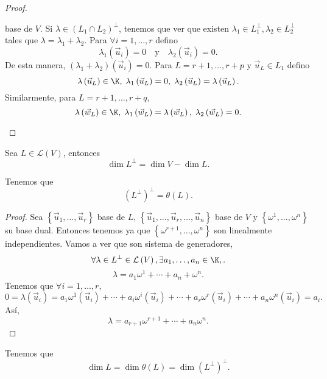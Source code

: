 \begin{proof}
\begin{description}
	base de $\displaystyle V $. Si $\displaystyle \lambda \in \left(L_{1}\cap L_{2}\right)^{\perp}$, tenemos que ver que existen $\displaystyle \lambda_{1} \in L_{1}^{\perp}, \lambda_{2}\in L_{2}^{\perp} $ tales que $\displaystyle \lambda = \lambda_{1} + \lambda_{2} $. Para $\displaystyle \forall i = 1, \ldots, r $ defino 
	\[\lambda_{1}\left(\vec{u}_{i}\right) = 0 \quad \text{y} \quad \lambda_{2}\left(\vec{u}_{i}\right) = 0 .\]
De esta manera, $\displaystyle \left(\lambda_{1}+\lambda_{2}\right)\left(\vec{u}_{i}\right) = 0 $. Para $\displaystyle L = r+1, \ldots, r+p $ y $\displaystyle \vec{u}_{L} \in L_{1} $ defino
\[\lambda\left(\vec{u}_{L}\right) \in \K, \;  \lambda_{1}\left(\vec{u}_{L}\right) = 0, \; \lambda_{2}\left(\vec{u}_{L}\right) = \lambda\left(\vec{u}_{L}\right) .\]
Similarmente, para $\displaystyle L = r+1, \ldots, r+q $, 
\[\lambda\left(\vec{w}_{L}\right) \in \K, \; \lambda_{1}\left(\vec{w}_{L}\right) = \lambda\left(\vec{w}_{L}\right), \; \lambda_{2}\left(\vec{w}_{L}\right) = 0 .\]

\end{description}
\end{proof}

\begin{ftheorem}[]
\normalfont Sea $\displaystyle L \in \mathcal{L}\left(V\right) $, entonces 
\[\dim L^{\perp} = \dim V - \dim L .\]
\end{ftheorem}

\begin{observation}
\normalfont Tenemos que 
\[\left(L^{\perp}\right)^{\perp} = \theta\left(L\right) .\]
\end{observation}

\begin{proof}
	Sea $\displaystyle \left\{\vec{u}_{1}, \ldots, \vec{u}_{r} \right\}  $ base de $\displaystyle L $, $\displaystyle \left\{ \vec{u}_{1}, \ldots, \vec{u}_{r}, \ldots, \vec{u}_{n}\right\}  $ base de $\displaystyle V $ y $\displaystyle \left\{ \omega^{1}, \ldots, \omega^{n}\right\}  $ su base dual. Entonces tenemos ya que $\displaystyle \left\{ \omega^{r+1}, \ldots, \omega^{n}\right\}  $ son linealmente independientes. Vamos a ver que son sistema de generadores, 
	\[\forall \lambda \in L^{\perp} \in \mathcal{L}\left(V\right), \exists a_{1}, \ldots, a_{n} \in \K, .\]
	\[\lambda = a_{1}\omega^{1} + \cdots + a_{n}+\omega^{n} .\]
Tenemos que $\displaystyle \forall i = 1, \ldots, r $, 
\[0 = \lambda\left(\vec{u}_{i}\right) = a_{1}\omega^{1}\left(\vec{u}_{i}\right)+ \cdots + a_{i}\omega^{i}\left(\vec{u}_{i}\right) + \cdots + a_{r}\omega^{r}\left(\vec{u}_{i}\right) + \cdots + a_{n}\omega^{n}\left(\vec{u}_{i}\right) = a_{i} .\]
Así, 
\[\lambda = a_{r+1}\omega^{r+1} + \cdots + a_{n}\omega^{n} .\]
\end{proof}

\begin{observation}
\normalfont Tenemos que 
\[\dim L = \dim \theta\left(L\right) = \dim \left(L^{\perp}\right)^{\perp} .\]
\end{observation}

